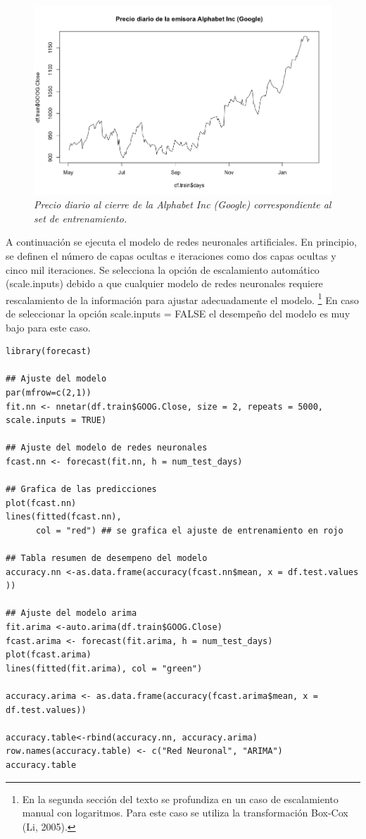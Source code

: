 \documentclass[letterpaper,12pt, spanish, oneside]{book} %
\let\oldfootnote\footnote
\renewcommand{\footnote}[1]{%
  \begingroup%
  \linespread{1.2}%
  \oldfootnote{#1}%
  \endgroup%
}
\begin{document}
\begin{figure}[H]
\centering
\includegraphics[width=1\textwidth]{Google2.png}
\caption{\label{fig:frog2}\textit{Precio diario al cierre de la Alphabet Inc (Google) correspondiente al set de entrenamiento.}}
\end{figure}

A continuación se ejecuta el modelo de redes neuronales artificiales. En principio, se definen el número de capas ocultas e iteraciones como dos capas ocultas y cinco mil iteraciones. Se selecciona la opción de escalamiento automático (scale.inputs) debido a que cualquier modelo de redes neuronales requiere rescalamiento de la información para ajustar adecuadamente el modelo. \footnote{ En la segunda sección del texto se profundiza en un caso de escalamiento manual con logaritmos. Para este caso se utiliza la transformación Box-Cox (Li, 2005).} En caso de seleccionar la opción scale.inputs = FALSE el desempeño del modelo es muy bajo para este caso.

\begin{lstlisting}
library(forecast)

## Ajuste del modelo
par(mfrow=c(2,1))
fit.nn <- nnetar(df.train$GOOG.Close, size = 2, repeats = 5000, scale.inputs = TRUE) 

## Ajuste del modelo de redes neuronales
fcast.nn <- forecast(fit.nn, h = num_test_days)

## Grafica de las predicciones
plot(fcast.nn)
lines(fitted(fcast.nn), 
      col = "red") ## se grafica el ajuste de entrenamiento en rojo

## Tabla resumen de desempeno del modelo
accuracy.nn <-as.data.frame(accuracy(fcast.nn$mean, x = df.test.values ))

## Ajuste del modelo arima
fit.arima <-auto.arima(df.train$GOOG.Close)
fcast.arima <- forecast(fit.arima, h = num_test_days)
plot(fcast.arima)
lines(fitted(fit.arima), col = "green")

accuracy.arima <- as.data.frame(accuracy(fcast.arima$mean, x = df.test.values))

accuracy.table<-rbind(accuracy.nn, accuracy.arima)
row.names(accuracy.table) <- c("Red Neuronal", "ARIMA")
accuracy.table
\end{lstlisting}
\end{document}
